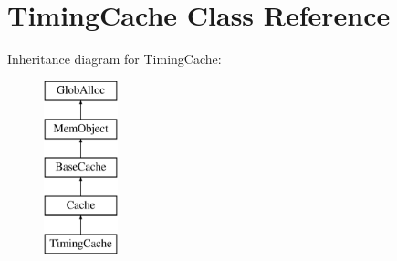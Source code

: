 \hypertarget{classTimingCache}{\section{Timing\-Cache Class Reference}
\label{classTimingCache}
}
Inheritance diagram for Timing\-Cache\-:\begin{figure}[H]
\begin{center}
\leavevmode
\includegraphics[height=5.000000cm]{classTimingCache}
\end{center}
\end{figure}
